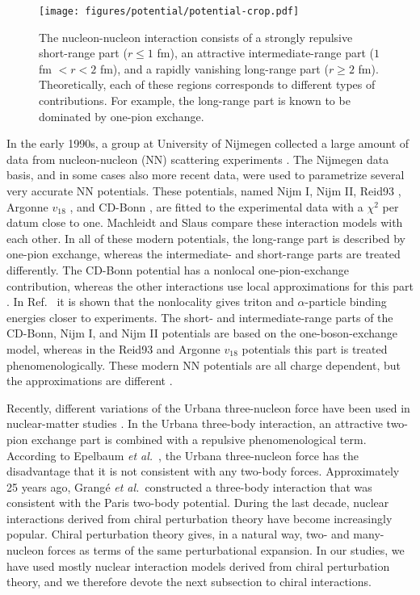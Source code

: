\documentclass[a4paper,12pt]{report}
\begin{document}
\begin{figure} 
  \centering
  \texttt{[image: figures/potential/potential-crop.pdf]}
  \caption{The nucleon-nucleon interaction
    consists of a strongly repulsive short-range part
    ($r \leq 1 $ fm), an attractive intermediate-range
    part ($1$ fm $< r < 2$ fm), and a rapidly vanishing 
    long-range part ($r \geq 2$ fm). Theoretically, each
    of these regions corresponds to different types of 
    contributions. For example, the long-range part is
    known to be dominated by one-pion exchange.}
  \label{fig:potential}
\end{figure}

In the early 1990s, a group at University of Nijmegen
collected a large amount of data from nucleon-nucleon (NN)
scattering experiments \cite{stoks1993}. The Nijmegen data 
basis, and in some cases also more recent data, were used
to parametrize several very accurate NN
potentials. These potentials, named Nijm I, Nijm II, Reid93 
\cite{stoks1994}, Argonne $v_{18}$ 
\cite{wiringa1995}, and CD-Bonn \cite{machleidt2001b},
are fitted to the experimental data with a $\chi^{2}$
per datum close to one. Machleidt and Slaus compare
\cite{machleidt2001} these interaction models with each
other. In all of these modern potentials, the long-range
part is described by one-pion exchange, whereas the
intermediate- and short-range parts are treated 
differently. The CD-Bonn potential has a nonlocal 
one-pion-exchange contribution, whereas the other 
interactions use local approximations for this part 
\cite{machleidt2001}. In Ref.~\cite{machleidt2001b} 
it is shown that the nonlocality gives triton and 
$\alpha $-particle binding energies closer to experiments. 
The short- and intermediate-range parts of the
CD-Bonn, Nijm I, and Nijm II potentials are based
on the one-boson-exchange model, whereas in the Reid93 
and Argonne $v_{18}$ potentials this part is treated
phenomenologically. These modern NN potentials are
all charge dependent, but the approximations 
are different \cite{machleidt2001}.

Recently, different variations of the Urbana 
three-nucleon force \cite{carlson1983,pudliner1995,
pudliner1997} have been used in nuclear-matter 
studies \cite{soma2008,gandolfi_2009}. In the Urbana 
three-body interaction, an attractive two-pion exchange 
part is combined with a repulsive phenomenological term. 
According to Epelbaum \emph{et al.}~\cite{epelbaum_2009b}, 
the Urbana three-nucleon force has the disadvantage that 
it is not consistent with any two-body forces.
Approximately 25 years ago, Grang{\'e} 
\emph{et al.}~constructed a three-body interaction 
\cite{grange1989} 
that was consistent with the Paris two-body potential.
During the last decade, nuclear interactions derived 
from chiral perturbation theory \cite{epelbaum2006,
epelbaum_2009b,machleidt2011} have become increasingly 
popular. Chiral perturbation theory gives, in a natural 
way, two- and many-nucleon forces as terms 
of the same perturbational expansion. In our studies, 
we have used mostly nuclear interaction models derived 
from chiral perturbation theory, and we therefore devote 
the next subsection to chiral interactions.
\end{document}
